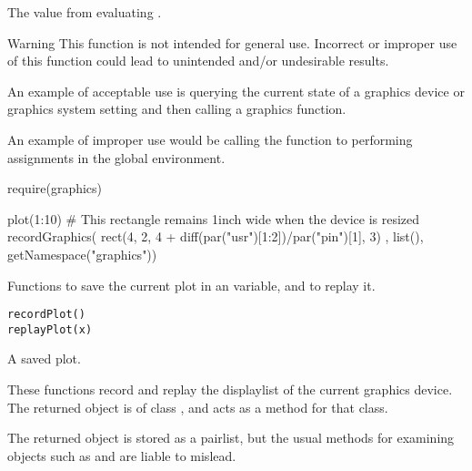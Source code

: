 %
\begin{Value}
The value from evaluating .
\end{Value}
%
\begin{Section}{Warning}
This function is not intended for general use.  Incorrect or
improper use of this function could lead to unintended and/or
undesirable results.

An example of acceptable use is querying the current state
of a graphics device or graphics system setting and then
calling a graphics function.

An example of improper use would be calling the  function
to performing assignments in the global environment.
\end{Section}
%
\begin{SeeAlso}\relax
{} 
\end{SeeAlso}
%
\begin{Examples}
\begin{ExampleCode}
require(graphics)

plot(1:10)
# This rectangle remains 1inch wide when the device is resized
recordGraphics(
  {
    rect(4, 2,
         4 + diff(par("usr")[1:2])/par("pin")[1], 3)
  },
  list(),
  getNamespace("graphics"))
\end{ExampleCode}
\end{Examples}
%
\begin{Description}\relax
Functions to save the current plot in an \R{} variable, and to replay it.
\end{Description}
%
\begin{Usage}
\begin{verbatim}
recordPlot()
replayPlot(x)
\end{verbatim}
\end{Usage}
%
\begin{Arguments}
\begin{ldescription}
\item[\code{x}] A saved plot.
\end{ldescription}
\end{Arguments}
%
\begin{Details}\relax
These functions record and replay the displaylist of the current
graphics device.  The returned object is of class
, and  acts as a 
method for that class.

The returned object is stored as a pairlist, but the usual methods for
examining \R{} objects such as  and
 are liable to mislead. 
\end{Details}
